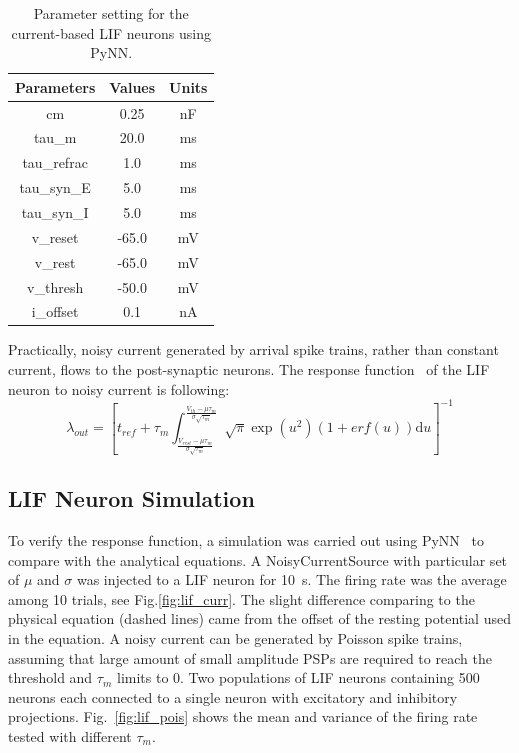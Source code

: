 \documentclass[runningheads,a4paper]{llncs}
\def\D{\mathrm{d}}
\begin{document}
\begin{table}[hbbp]
	\centering
	\caption{\label{tbl:pynnSetting}Parameter setting for the current-based LIF neurons using PyNN.}
	\bgroup
	\def\arraystretch{1.4}
	\begin{tabular}{c c c}
		Parameters & Values & Units \\
		\hline
		cm & 0.25 & nF	\\
		tau\_m & 20.0 & ms\\
		tau\_refrac & 1.0 & ms\\
		tau\_syn\_E & 5.0 & ms\\
		tau\_syn\_I & 5.0 & ms\\
		v\_reset & -65.0 & mV\\
		v\_rest & -65.0 & mV\\
		v\_thresh & -50.0 & mV\\
		i\_offset & 0.1 & nA\\
	\end{tabular}
	\egroup
\end{table}

Practically, noisy current generated by arrival spike trains, rather than constant current, flows to the post-synaptic neurons.
The response function~\cite{la2008response} of the LIF neuron to noisy current is following:
\begin{equation}
\lambda_\mathit{out}=
\left [ t_\mathit{ref}+\tau_m \int_{\frac{V_\mathit{rest}-\mu \tau_m }{\sigma \sqrt{\tau_m}}}^{\frac{V_{th}-\mu \tau_m }{\sigma \sqrt{\tau_m}}} \sqrt{\pi} \exp(u^{2}) (1+erf(u)) \D u \right ]^{-1}
\label{equ:noiseI}
\end{equation}

\subsection{LIF Neuron Simulation}
To verify the response function, a simulation was carried out using PyNN~\cite{davison2008pynn} to compare with the analytical equations.
A NoisyCurrentSource with particular set of $\mu$ and $\sigma$ was injected to a LIF neuron for 10~s.
The firing rate was the average among 10 trials, see Fig.\ref{fig:lif_curr}.
The slight difference comparing to the physical equation (dashed lines) came from the offset of the resting potential used in the equation.
A noisy current can be generated by Poisson spike trains, assuming that large amount of small amplitude PSPs are required to reach the threshold and $\tau_m$ limits to 0.
Two populations of LIF neurons containing 500 neurons each connected to a single neuron with excitatory and inhibitory projections. 
Fig.~\ref{fig:lif_pois} shows the mean and variance of the firing rate tested with different $\tau_m$.
\end{document}
